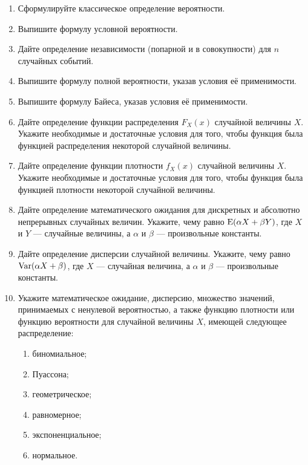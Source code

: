 \begin{enumerate}
	\item Сформулируйте классическое определение вероятности.
	\item Выпишите формулу условной вероятности.
	\item Дайте определение независимости (попарной и в совокупности) для $n$ случайных событий.
	\item Выпишите формулу полной вероятности, указав условия её применимости.
	\item Выпишите формулу Байеса, указав условия её применимости.
	\item Дайте определение функции распределения $F_{X}(x)$ случайной величины $X$. 
	Укажите необходимые и достаточные условия для того, чтобы  функция
	была функцией распределения некоторой случайной величины.
	\item Дайте определение функции плотности $f_{X}(x)$ случайной величины $X$. 
	Укажите необходимые и достаточные условия для того, чтобы  функция
была функцией плотности некоторой случайной величины.
	\item Дайте определение математического ожидания для дискретных и абсолютно непрерывных случайных величин. 
	Укажите, чему равно $\operatorname{E}(\alpha X+\beta Y)$, где $X$ и $Y$ — случайные величины, а $\alpha$ и $\beta$ — произвольные константы.
	\item Дайте определение дисперсии случайной величины. 
	Укажите, чему равно $\operatorname{Var}(\alpha X+\beta)$, где $X$ — случайная величина, 
	а $\alpha$ и $\beta$ — произвольные константы.
	\item Укажите математическое ожидание, дисперсию, множество значений, 
	принимаемых с ненулевой вероятностью, а также функцию плотности или функцию вероятности для случайной величины $X$, 
	имеющей следующее распределение:
	\begin{enumerate}
	\item биномиальное;
	\item Пуассона;
	\item геометрическое;
	\item равномерное;
	\item экспоненциальное;
	\item нормальное.
	\end{enumerate}


\end{enumerate}
